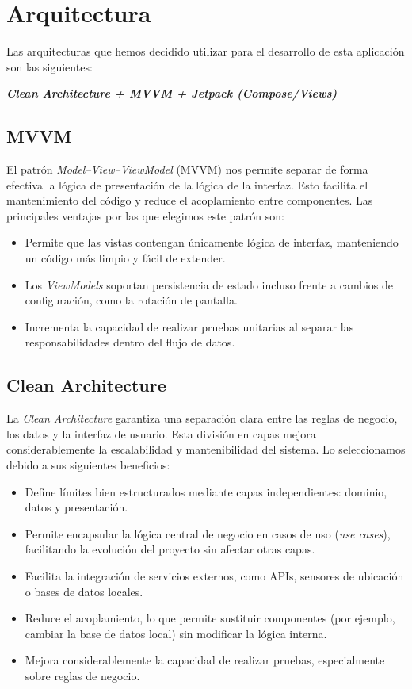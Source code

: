 \section{Arquitectura}
Las arquitecturas que hemos decidido utilizar para el desarrollo de esta aplicación son las siguientes:
\begin{center}
    \textbf{\textit{Clean Architecture + MVVM + Jetpack (Compose/Views)}}
\end{center}

\subsection{MVVM}
El patrón \textit{Model–View–ViewModel} (MVVM) nos permite separar de forma efectiva la lógica de presentación de la lógica de la interfaz.
 Esto facilita el mantenimiento del código y reduce el acoplamiento entre componentes. 
 Las principales ventajas por las que elegimos este patrón son:

\begin{itemize}
    \item Permite que las vistas contengan únicamente lógica de interfaz, manteniendo un código más limpio y fácil de extender.
    \item Los \textit{ViewModels} soportan persistencia de estado incluso frente a cambios de configuración,
    como la rotación de pantalla.
    \item Incrementa la capacidad de realizar pruebas unitarias al separar las responsabilidades dentro del flujo de datos.
\end{itemize}

\subsection{Clean Architecture}
La \textit{Clean Architecture} garantiza una separación clara entre las reglas de negocio, 
los datos y la interfaz de usuario. Esta división en capas mejora considerablemente la escalabilidad y 
mantenibilidad del sistema. Lo seleccionamos debido a sus siguientes beneficios:

\begin{itemize}
    \item Define límites bien estructurados mediante capas independientes: dominio, datos y presentación.
    \item Permite encapsular la lógica central de negocio en casos de uso (\textit{use cases}), 
    facilitando la evolución del proyecto sin afectar otras capas.
    \item Facilita la integración de servicios externos, como APIs, sensores de ubicación o bases de datos locales.
    \item Reduce el acoplamiento, lo que permite sustituir componentes (por ejemplo, cambiar la base de datos local) 
    sin modificar la lógica interna.
    \item Mejora considerablemente la capacidad de realizar pruebas, especialmente sobre reglas de negocio.
\end{itemize}

